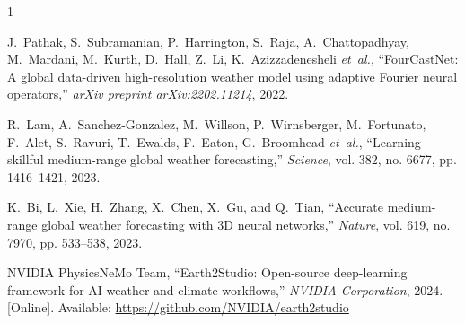 \documentclass[10pt,journal,compsoc]{IEEEtran}
\begin{document}

\begin{thebibliography}{1}

J.~Pathak, S.~Subramanian, P.~Harrington, S.~Raja, A.~Chattopadhyay, M.~Mardani, M.~Kurth, D.~Hall, Z.~Li, K.~Azizzadenesheli \emph{et~al.}, ``FourCastNet: A global data-driven high-resolution weather model using adaptive Fourier neural operators,'' \emph{arXiv preprint arXiv:2202.11214}, 2022.

R.~Lam, A.~Sanchez-Gonzalez, M.~Willson, P.~Wirnsberger, M.~Fortunato, F.~Alet, S.~Ravuri, T.~Ewalds, F.~Eaton, G.~Broomhead \emph{et~al.}, ``Learning skillful medium-range global weather forecasting,'' \emph{Science}, vol. 382, no. 6677, pp. 1416--1421, 2023.

K.~Bi, L.~Xie, H.~Zhang, X.~Chen, X.~Gu, and Q.~Tian, ``Accurate medium-range global weather forecasting with 3D neural networks,'' \emph{Nature}, vol. 619, no. 7970, pp. 533--538, 2023.

NVIDIA PhysicsNeMo Team, ``Earth2Studio: Open-source deep-learning framework for AI weather and climate workflows,'' \emph{NVIDIA Corporation}, 2024. [Online]. Available: \url{https://github.com/NVIDIA/earth2studio}

\end{thebibliography}
\end{document}
